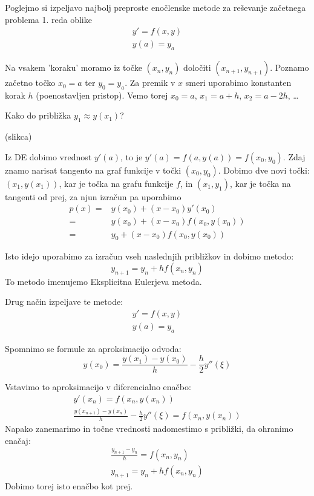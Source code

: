 \documentclass[a4paper,12pt]{article}
\theoremstyle{definition}
\theoremstyle{remark}
\begin{document}
Poglejmo si izpeljavo najbolj preproste enočlenske metode za reševanje začetnega problema 1. reda oblike
\begin{gather*}
    y' = f(x, y) \\
    y(a) = y_a
\end{gather*}

Na vsakem 'koraku' moramo iz točke $(x_n, y_n)$ določiti $(x_{n+1}, y_{n+1})$. Poznamo začetno točko $x_0 = a$ ter $y_0 = y_a$. Za premik v $x$ smeri
uporabimo konstanten korak $h$ (poenostavljen pristop). Vemo torej $x_0 = a$, $x_1 = a+h$, $x_2 = a-2h$, \dots

Kako do približka $y_1 \approx y(x_1)$?

(slikca)

Iz DE dobimo vrednost $y'(a)$, to je $y'(a) = f(a, y(a)) = f(x_0, y_0)$. Zdaj znamo narisat tangento na graf funkcije v točki $(x_0, y_0)$. Dobimo 
dve novi točki: $(x_1, y(x_1))$, kar je točka na grafu funkcije $f$, in $(x_1, y_1)$, kar je točka na tangenti od prej, za njun izračun pa uporabimo
\begin{align*}
    p(x) =& y(x_0) + (x-x_0)y'(x_0) \\
         =& y(x_0) + (x-x_0)f(x_0, y(x_0)) \\
         =& y_0 + (x-x_0)f(x_0, y(x_0))
\end{align*}

Isto idejo uporabimo za izračun vseh naslednjih približkov in dobimo metodo:
\begin{equation*}
    y_{n+1} = y_n + h f(x_n, y_n)
\end{equation*}
To metodo imenujemo Eksplicitna Eulerjeva metoda.

Drug način izpeljave te metode:
\begin{gather*}
    y' = f(x, y) \\
    y(a) = y_a
\end{gather*}

Spomnimo se formule za aproksimacijo odvoda:
\begin{equation*}
    y(x_0) = \frac{y(x_1) - y(x_0)}{h} - \frac{h}{2} y''(\xi)
\end{equation*}

Vstavimo to aproksimacijo v diferencialno enačbo:
\begin{gather*}
    y'(x_n) = f(x_n, y(x_n)) \\
    \frac{y(x_{n+1}) - y(x_n)}{h} - \frac{h}{2} y''(\xi) = f(x_n, y(x_n))
\end{gather*}
Napako zanemarimo in točne vrednosti nadomestimo s približki, da ohranimo enačaj:
\begin{gather*}
    \frac{y_{n+1}- y_n}{h} = f(x_n, y_n) \\
    y_{n+1} = y_n + h f(x_n, y_n)
\end{gather*}
Dobimo torej isto enačbo kot prej.
\end{document}
